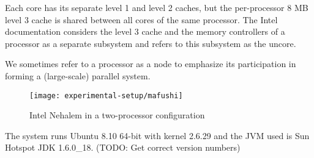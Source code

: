 Each core has its separate level 1 and level 2 caches, but the
per-processor 8 MB level 3 cache is shared between all cores of the
same processor. The Intel documentation considers the level 3 cache
and the memory controllers of a processor as a separate subsystem and
refers to this subsystem as the uncore. 

We sometimes refer to a processor as a node to emphasize its
participation in forming a (large-scale) parallel system.

\begin{figure}[htb]
  \centering
  \texttt{[image: experimental-setup/mafushi]}
  \caption[Intel Nehalem in a two-processor configuration]{Intel
    Nehalem in a two-processor configuration}
  \label{fig:experimental-setup-mafushi}
\end{figure}

The system runs Ubuntu 8.10 64-bit with kernel 2.6.29 and the JVM used
is Sun Hotspot JDK 1.6.0\_18. (TODO: Get correct version numbers)



